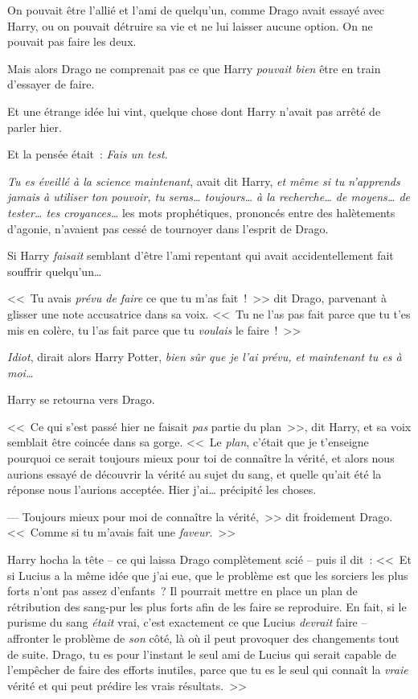 On pouvait être l'allié et l'ami de quelqu'un, comme Drago avait essayé avec Harry, ou on pouvait détruire sa vie et ne lui laisser aucune option. On ne pouvait pas faire les deux.

Mais alors Drago ne comprenait pas ce que Harry \emph{pouvait bien} être en train d'essayer de faire.

Et une étrange idée lui vint, quelque chose dont Harry n'avait pas arrêté de parler hier.

Et la pensée était~: \emph{Fais un test}.

\emph{Tu es éveillé à la science maintenant}, avait dit Harry, \emph{et même si tu n'apprends jamais à utiliser ton pouvoir, tu seras… toujours… à la recherche… de moyens… de tester… tes croyances…} les mots prophétiques, prononcés entre des halètements d'agonie, n'avaient pas cessé de tournoyer dans l'esprit de Drago.

Si Harry \emph{faisait} semblant d'être l'ami repentant qui avait accidentellement fait souffrir quelqu'un…

<<~Tu avais \emph{prévu de faire} ce que tu m'as fait~!~>> dit Drago, parvenant à glisser une note accusatrice dans sa voix. <<~Tu ne l'as pas fait parce que tu t'es mis en colère, tu l'as fait parce que tu \emph{voulais} le faire~!~>>

\emph{Idiot}, dirait alors Harry Potter, \emph{bien sûr que je l'ai prévu, et maintenant tu es à moi…}

Harry se retourna vers Drago.

<<~Ce qui s'est passé hier ne faisait \emph{pas} partie du plan~>>, dit Harry, et sa voix semblait être coincée dans sa gorge. <<~Le \emph{plan}, c'était que je t'enseigne pourquoi ce serait toujours mieux pour toi de connaître la vérité, et alors nous aurions essayé de découvrir la vérité au sujet du sang, et quelle qu'ait été la réponse nous l'aurions acceptée. Hier j'ai… précipité les choses.

--- Toujours mieux pour moi de connaître la vérité,~>> dit froidement Drago. <<~Comme si tu m'avais fait une \emph{faveur}.~>>

Harry hocha la tête -- ce qui laissa Drago complètement scié -- puis il dit~: <<~Et si Lucius a la même idée que j'ai eue, que le problème est que les sorciers les plus forts n'ont pas assez d'enfants~? Il pourrait mettre en place un plan de rétribution des sang-pur les plus forts afin de les faire se reproduire. En fait, si le purisme du sang \emph{était} vrai, c'est exactement ce que Lucius \emph{devrait} faire -- affronter le problème de \emph{son} côté, là où il peut provoquer des changements tout de suite. Drago, tu es pour l'instant le seul ami de Lucius qui serait capable de l'empêcher de faire des efforts inutiles, parce que tu es le seul qui connaît la \emph{vraie} vérité et qui peut prédire les vrais résultats.~>>

